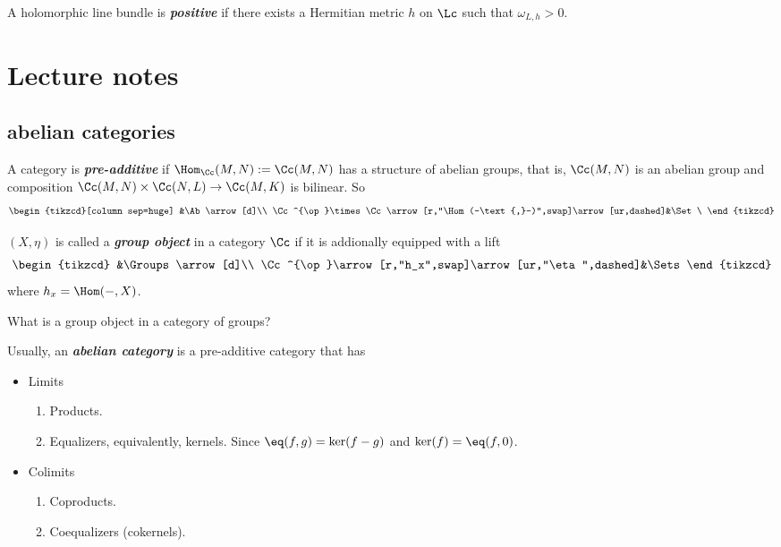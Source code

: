 \begin{defn}
	A holomorphic line bundle is \textbf{\textit{positive}} if there exists a Hermitian metric $h$ on $\Lc$ such that $\omega_{L,h}>0$.
\end{defn}
\clearpage

\section{Lecture notes}
\subsection{abelian categories}
\begin{defn}
	A category is \textbf{\textit{pre-additive}} if $\Hom_\Cc(M,N):=\Cc(M,N)$ has a structure of abelian groups, that is, $\Cc(M,N)$ is an abelian group and composition $\Cc(M,N)\times\Cc(N,L)\to\Cc(M,K)$ is bilinear. So
	\[\begin{tikzcd}[column sep=huge]
		&\Ab\arrow[d]\\
	\Cc^{\op}\times\Cc\arrow[r,"\Hom(-\text{,}-)",swap]\arrow[ur,dashed]&\Set
\	\end{tikzcd}\]
\end{defn}
\begin{defn}
	$(X,\eta)$ is called a \textbf{\textit{group object}} in a category $\Cc$ if it is addionally equipped with a lift
	\[\begin{tikzcd}
		&\Groups\arrow[d]\\		\Cc^{\op}\arrow[r,"h_x",swap]\arrow[ur,"\eta",dashed]&\Sets
	\end{tikzcd}\]
	where $h_x=\Hom(-,X)$.
\end{defn}
\begin{exercise}
	What is a group object in a category of groups?
\end{exercise}
\begin{defn}
	Usually, an \textbf{\textit{abelian category}} is a pre-additive category that has
	\begin{itemize}
		\item Limits
		\begin{enumerate}
			\item Products.
			\item Equalizers, equivalently, kernels. Since $\eq(f,g)=\ker(f-g)$ and $\ker(f)=\eq(f,0)$.
		\end{enumerate}
		\item Colimits
		\begin{enumerate}
			\item Coproducts.
			\item Coequalizers (cokernels).
		\end{enumerate}
	\end{itemize}
\end{defn}
